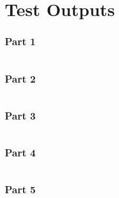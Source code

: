 \documentclass[12pt]{article}
\begin{document}
\begin{lstlisting}

\end{lstlisting}

\section {Test Outputs}

\subsubsection{Part 1}
\begin{lstlisting}

\end{lstlisting}

\subsubsection{Part 2}
\begin{lstlisting}

\end{lstlisting}

\subsubsection{Part 3}
\begin{lstlisting}

\end{lstlisting}

\subsubsection{Part 4}
\begin{lstlisting}

\end{lstlisting}

\subsubsection{Part 5}
\begin{lstlisting}

\end{lstlisting}
\end{document}
